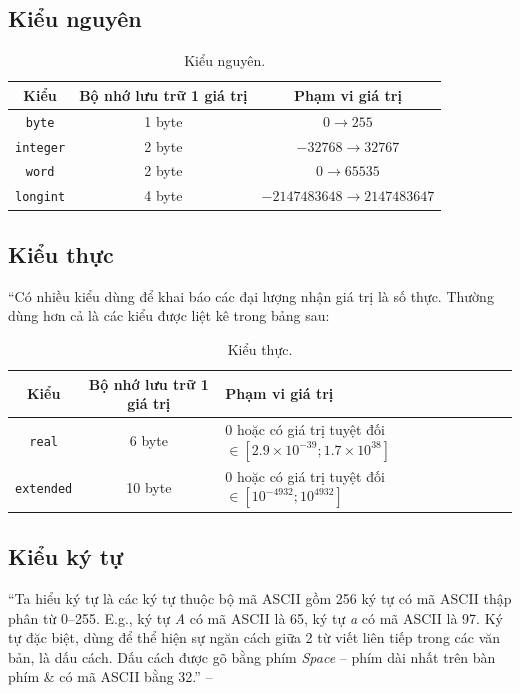 \documentclass[oneside]{book}
\numberwithin{equation}{section}
\begin{document}
\subsection{Kiểu nguyên}

\begin{table}[H]
	\centering
	\begin{tabular}{|c|c|c|}
		\hline
		\textbf{Kiểu} & \textbf{Bộ nhớ lưu trữ 1 giá trị} & \textbf{Phạm vi giá trị} \\
		\hline
		\texttt{byte} & 1 byte & $0\to255$ \\
		\hline
		\texttt{integer} & 2 byte & $-32768\to32767$ \\
		\hline
		\texttt{word} & 2 byte & $0\to65535$ \\
		\hline
		\texttt{longint} & 4 byte & $-2147483648\to2147483647$ \\
		\hline
	\end{tabular}
	\caption{Kiểu nguyên.}
\end{table}

\subsection{Kiểu thực}
``Có nhiều kiểu dùng để khai báo các đại lượng nhận giá trị là số thực. Thường dùng hơn cả là các kiểu được liệt kê trong bảng sau:

\begin{table}[H]
	\centering
	\begin{tabular}{|c|c|l|}
		\hline
		\textbf{Kiểu} & \textbf{Bộ nhớ lưu trữ 1 giá trị} & \textbf{Phạm vi giá trị} \\
		\hline
		\texttt{real} & 6 byte & $0$ hoặc có giá trị tuyệt đối $\in[2.9\times 10^{-39};1.7\times 10^{38}]$ \\
		\hline
		\texttt{extended} & 10 byte & $0$ hoặc có giá trị tuyệt đối $\in[10^{-4932};10^{4932}]$ \\
		\hline
	\end{tabular}
	\caption{Kiểu thực.}
\end{table}

\subsection{Kiểu ký tự}
``Ta hiểu ký tự là các ký tự thuộc bộ mã ASCII gồm 256 ký tự có mã ASCII thập phân từ 0--255. E.g., ký tự \textit{A} có mã ASCII là 65, ký tự \textit{a} có mã ASCII là 97. Ký tự đặc biệt, dùng để thể hiện sự ngăn cách giữa 2 từ viết liên tiếp trong các văn bản, là dấu cách. Dấu cách được gõ bằng phím \textit{Space} -- phím dài nhất trên bàn phím \& có mã ASCII bằng 32.'' -- \cite[p. 22]{SGK_Tin_Hoc_11}
\end{document}
